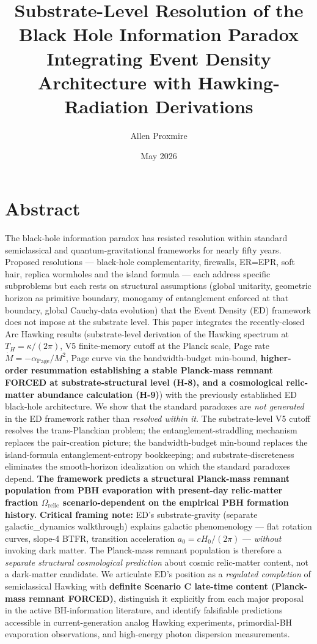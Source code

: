 \documentclass[11pt,a4paper]{article}
\title{\vspace{-1cm}\Large\bfseries Substrate-Level Resolution of the Black Hole Information Paradox\\[6pt]
\large\mdseries Integrating Event Density Architecture with Hawking-Radiation Derivations}
\author{Allen Proxmire}
\date{May 2026}
\begin{document}
\maketitle
\thispagestyle{empty}

\vspace{-0.5cm}

\section*{Abstract}
The black-hole information paradox has resisted resolution within standard semiclassical and quantum-gravitational frameworks for nearly fifty years. Proposed resolutions --- black-hole complementarity, firewalls, ER=EPR, soft hair, replica wormholes and the island formula --- each address specific subproblems but each rests on structural assumptions (global unitarity, geometric horizon as primitive boundary, monogamy of entanglement enforced at that boundary, global Cauchy-data evolution) that the Event Density (ED) framework does not impose at the substrate level. This paper integrates the recently-closed Arc Hawking results (substrate-level derivation of the Hawking spectrum at $T_H = \kappa/(2\pi)$, V5 finite-memory cutoff at the Planck scale, Page rate $\dot M = -\alpha_{\mathrm{Page}}/M^2$, Page curve via the bandwidth-budget min-bound, \textbf{higher-order resummation establishing a stable Planck-mass remnant FORCED at substrate-structural level (H-8), and a cosmological relic-matter abundance calculation (H-9)}) with the previously established ED black-hole architecture. We show that the standard paradoxes are \emph{not generated} in the ED framework rather than \emph{resolved within it}. The substrate-level V5 cutoff resolves the trans-Planckian problem; the entanglement-straddling mechanism replaces the pair-creation picture; the bandwidth-budget min-bound replaces the island-formula entanglement-entropy bookkeeping; and substrate-discreteness eliminates the smooth-horizon idealization on which the standard paradoxes depend. \textbf{The framework predicts a structural Planck-mass remnant population from PBH evaporation with present-day relic-matter fraction $\Omega_{\mathrm{relic}}$ scenario-dependent on the empirical PBH formation history.} \textbf{Critical framing note:} ED's substrate-gravity (separate galactic\_dynamics walkthrough) explains galactic phenomenology --- flat rotation curves, slope-4 BTFR, transition acceleration $a_0 = cH_0/(2\pi)$ --- \emph{without} invoking dark matter. The Planck-mass remnant population is therefore a \emph{separate structural cosmological prediction} about cosmic relic-matter content, not a dark-matter candidate. We articulate ED's position as a \emph{regulated completion} of semiclassical Hawking with \textbf{definite Scenario C late-time content (Planck-mass remnant FORCED)}, distinguish it explicitly from each major proposal in the active BH-information literature, and identify falsifiable predictions accessible in current-generation analog Hawking experiments, primordial-BH evaporation observations, and high-energy photon dispersion measurements.
\end{document}

